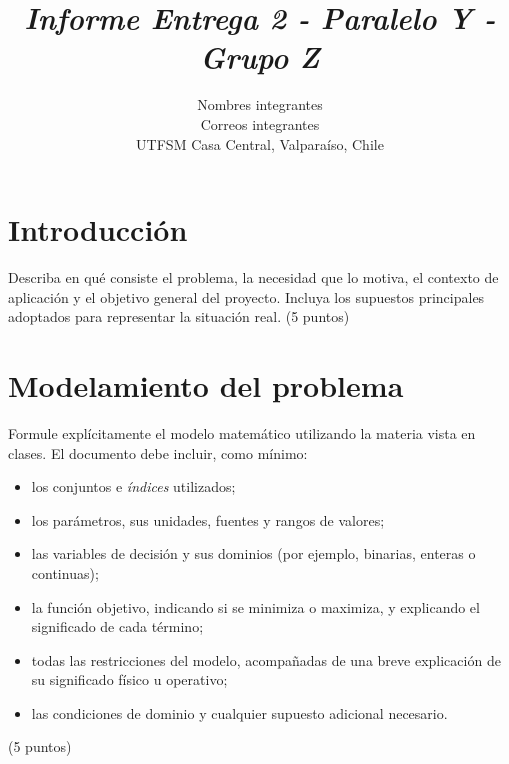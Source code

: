\documentclass[journal, 12pt, onecolumn]{IEEEtran}
\begin{document}
\title{\textit{Informe Entrega 2 - Paralelo Y - Grupo Z}}
\author{Nombres integrantes \\ 
Correos integrantes \\
UTFSM Casa Central, Valpara\'iso, Chile}
\maketitle

\section{Introducci\'on}
Describa en qu\'e consiste el problema, la necesidad que lo motiva, el contexto de
aplicaci\'on y el objetivo general del proyecto. Incluya los supuestos principales
adoptados para representar la situaci\'on real. (5 puntos)

\section{Modelamiento del problema}
Formule expl\'icitamente el modelo matem\'atico utilizando la materia vista en
clases. El documento debe incluir, como m\'inimo:
\begin{itemize}
    \item los conjuntos e \textit{\'indices} utilizados;
    \item los par\'ametros, sus unidades, fuentes y rangos de valores;
    \item las variables de decisi\'on y sus dominios (por ejemplo, binarias,
    enteras o continuas);
    \item la funci\'on objetivo, indicando si se minimiza o maximiza, y
    explicando el significado de cada t\'ermino;
    \item todas las restricciones del modelo, acompa\~nadas de una breve
    explicaci\'on de su significado f\'isico u operativo;
    \item las condiciones de dominio y cualquier supuesto adicional necesario.
\end{itemize}
(5 puntos)
\end{document}
